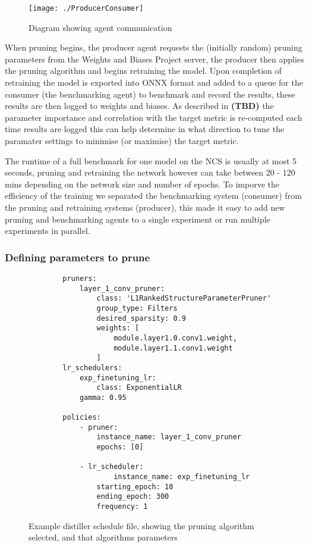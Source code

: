 \documentclass[../Dissertation.tex]{subfiles}
\begin{document}
\begin{figure}[H]
    \centering
    \texttt{[image: ./ProducerConsumer]}
    \caption{Diagram showing agent communication}
    \label{fig:agentCommunication}
\end{figure}

When pruning begins, the producer agent requests the (initially random) pruning parameters from the Weights and Biases Project server, the producer then applies the pruning algorithm and begins retraining the model.
Upon completion of retraining the model is exported into ONNX format and added to a queue for the consumer (the benchmarking agent) to benchmark and record the results, these results are then logged to weights and biases.
As described in \textbf{(TBD)} the parameter importance and correlation with the target metric is re-computed each time results are logged this can help determine in what direction to tune the paramater settings to minimise (or maximise) the target metric.

The runtime of a full benchmark for one model on the NCS is usually at most 5 seconds, pruning and retraining the network however can take between 20 - 120 mins depending on the network size and number of epochs. 
To imporve the efficiency of the training we separated the benchmarking system (consumer) from the pruning and retraining systems (producer), this made it easy to add new pruning and benchmarking agents to a single experiment or run multiple experiments in parallel.

\subsubsection{Defining parameters to prune}

\singlespacing
\begin{figure}[H]
    \begin{verbatim}
        pruners: 
            layer_1_conv_pruner:
                class: 'L1RankedStructureParameterPruner'
                group_type: Filters
                desired_sparsity: 0.9
                weights: [
                    module.layer1.0.conv1.weight,
                    module.layer1.1.conv1.weight
                ]
        lr_schedulers:
            exp_finetuning_lr:
                class: ExponentialLR
            gamma: 0.95

        policies:
            - pruner:
                instance_name: layer_1_conv_pruner
                epochs: [0]
            
            - lr_scheduler:
                    instance_name: exp_finetuning_lr
                starting_epoch: 10
                ending_epoch: 300
                frequency: 1
    \end{verbatim}
    \caption{Example distiller schedule file, showing the pruning algorithm selected, and that algorithms parameters}
    \label{fig:CompressionSchedule}
\end{figure}
\doublespacing
\end{document}
